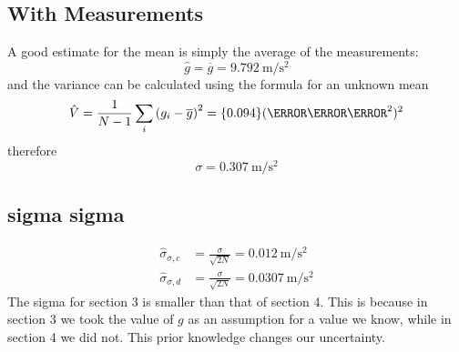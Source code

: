 \subsection{With Measurements}
A good estimate for the mean is simply the average of the measurements:
\begin{equation}
    \hat{g} = \overline{g} = \qty{9.792}{\meter\per\second^2}
\end{equation}
and the variance can be calculated using the formula for an unknown mean
\begin{equation}
    \hat{V} = \frac{1}{N-1}\sum_i\ins{g_i-\overline{g}}^2 = \qty{0.094}{(\meter\per\second^2)^2}
\end{equation}
therefore 
\begin{equation}
    \sigma = \qty{0.307}{\meter\per\second^2}
\end{equation}
\subsection{sigma sigma}
\begin{align}
    \hat{\sigma}_{\sigma,c} &= \frac{\sigma}{\sqrt{2N}} = \qty{0.012}{\meter\per\second^2} \\
    \hat{\sigma}_{\sigma,d} &= \frac{\sigma}{\sqrt{2N}} = \qty{0.0307}{\meter\per\second^2}
\end{align}
The sigma for section 3 is smaller than that of section 4. This is because in section 3 we took the value of \(g\) as an assumption for a value we know, while in section 4 we did not. This prior knowledge changes our uncertainty.